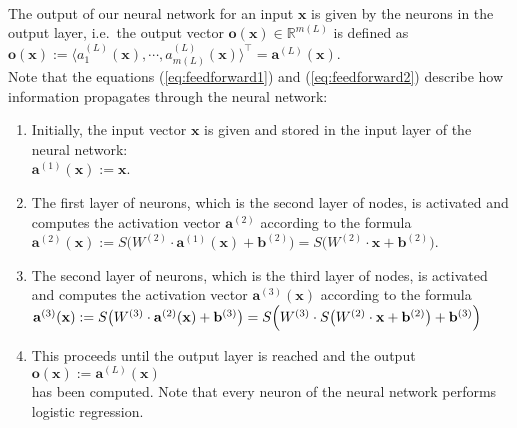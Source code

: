 \\[0.2cm]
The output of our neural network for an input $\mathbf{x}$ is given by the neurons in the output
layer,  i.e.~the output vector 
$\mathbf{o}(\mathbf{x}) \in \mathbb{R}^{m(L)}$ is defined as 
\\[0.2cm]
\hspace*{1.3cm}
$\mathbf{o}(\mathbf{x}) := \langle a^{(L)}_1(\mathbf{x}), \cdots, a^{(L)}_{m(L)}(\mathbf{x}) \rangle^\top = \mathbf{a}^{(L)}(\mathbf{x})$.
\\[0.2cm]
Note that the equations (\ref{eq:feedforward1}) and (\ref{eq:feedforward2}) describe how information propagates
through the neural network: 
\begin{enumerate}
\item Initially, the input vector $\mathbf{x}$ is given and stored in the input layer of the neural network:
      \\[0.2cm]
      \hspace*{1.3cm}
      $\mathbf{a}^{(1)}(\mathbf{x}) := \mathbf{x}$.
\item The first layer of neurons, which is the second layer of nodes,  is activated and computes the activation
      vector $\mathbf{a}^{(2)}$ according to the formula
      \\[0.2cm]
      \hspace*{1.3cm}
      $\mathbf{a}^{(2)}(\mathbf{x}) := S\bigl(W^{(2)} \cdot \mathbf{a}^{(1)}(\mathbf{x}) + \mathbf{b}^{(2)}\bigr) = 
                                        S\bigl(W^{(2)} \cdot \mathbf{x} + \mathbf{b}^{(2)}\bigr)
      $.
\item The second layer of neurons, which is the third layer of nodes,  is activated and computes the activation
      vector $\mathbf{a}^{(3)}(\mathbf{x})$ according to the formula
      \\[0.2cm]
      \hspace*{1.3cm}
      $\mathbf{a}^{(3)}(\mathbf{x}) := S\bigl(W^{(3)} \cdot \mathbf{a}^{(2)}(\mathbf{x}) + \mathbf{b}^{(3)}\bigr)
                          = S\Bigl(W^{(3)} \cdot S\bigl(W^{(2)} \cdot \mathbf{x} + \mathbf{b}^{(2)}\bigr) + \mathbf{b}^{(3)}\Bigr)
        $
\item This proceeds until the output layer is reached and the output
      \\[0.2cm]
      \hspace*{1.3cm}
      $\mathbf{o}(\mathbf{x}) := \mathbf{a}^{(L)}(\mathbf{x})$
      \\[0.2cm]
      has been computed.  Note that every neuron of the neural network performs logistic regression.
\end{enumerate}
